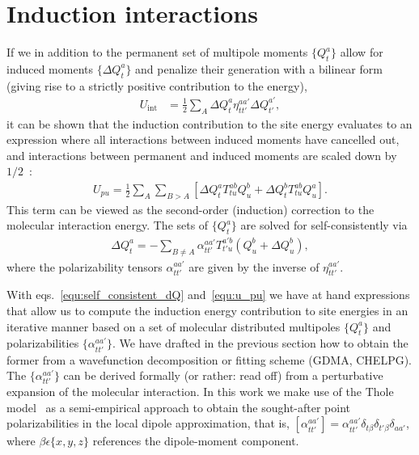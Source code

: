 \section{Induction interactions}
\label{sec:thole_model}


If we in addition to the permanent set of multipole moments $\{Q_t^a\}$ allow for induced moments $\{\Delta Q_t^a\}$ and penalize their generation with a bilinear form (giving rise to a strictly positive contribution to the energy),
\begin{align}
U_\textrm{int} &=\frac{1}{2} \sum_A \Delta Q_t^a \eta_{tt'}^{aa'} \Delta Q_{t'}^{a'},
\end{align}
it can be shown that the induction contribution to the site energy evaluates to an expression where all interactions between induced moments have cancelled out, and interactions between permanent and induced moments are scaled down by $1/2$~\cite{stone_theory_1997}:
\begin{align}
U_{pu} = \frac{1}{2} \sum_A \sum_{B > A} \left[ \Delta Q_t^a T_{tu}^{ab} Q_u^b + \Delta Q_t^b T_{tu}^{ab} Q_u^a \right].
\label{equ:u_pu}
\end{align}
This term can be viewed as the second-order (induction) correction to the molecular interaction energy. The sets of $\{Q_t^a\}$ are solved for self-consistently via
\begin{align}
\Delta Q_t^a = - \sum_{B \neq A} \alpha_{tt'}^{aa'} T_{t'u}^{a'b} (Q_u^b + \Delta Q_u^b),
\label{equ:self_consistent_dQ}
\end{align}
where the polarizability tensors $\alpha_{tt'}^{aa'}$ are given by the inverse of $\eta_{tt'}^{aa'}$.


With eqs.~\ref{equ:self_consistent_dQ} and~\ref{equ:u_pu} we have at hand expressions that allow us to compute the induction energy contribution to site energies in an iterative manner based on a set of molecular distributed multipoles $\{Q_t^a\}$ and polarizabilities $\{\alpha_{tt'}^{aa'}\}$. We have drafted in the previous section how to obtain the former from a wavefunction decomposition or fitting scheme (GDMA, CHELPG). The $\{\alpha_{tt'}^{aa'}\}$ can be derived formally (or rather: read off) from a perturbative expansion of the molecular interaction. In this work we make use of the Thole model~\cite{thole_molecular_1981, van_duijnen_molecular_1998} as a semi-empirical approach to obtain the sought-after point polarizabilities in the local dipole approximation, that is, $[\alpha_{tt'}^{aa'}] = \alpha_{tt'}^{aa'} \delta_{t \beta} \delta_{t'\beta} \delta_{aa'}$, where $\beta \epsilon \{x,y,z\}$ references the dipole-moment component.

